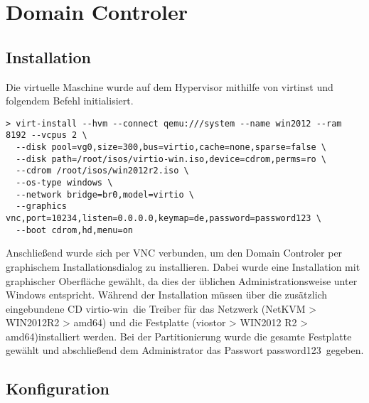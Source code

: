 \section{Domain Controler}

\subsection{Installation}

Die virtuelle Maschine wurde auf dem Hypervisor mithilfe von {\sc virtinst} und folgendem Befehl initialisiert.

\begin{lstlisting}[numbers=none]
> virt-install --hvm --connect qemu:///system --name win2012 --ram 8192 --vcpus 2 \
  --disk pool=vg0,size=300,bus=virtio,cache=none,sparse=false \
  --disk path=/root/isos/virtio-win.iso,device=cdrom,perms=ro \
  --cdrom /root/isos/win2012r2.iso \
  --os-type windows \
  --network bridge=br0,model=virtio \
  --graphics vnc,port=10234,listen=0.0.0.0,keymap=de,password=password123 \
  --boot cdrom,hd,menu=on
\end{lstlisting}

Anschließend wurde sich per VNC verbunden, um den Domain Controler per graphischem Installationsdialog zu installieren. Dabei wurde eine Installation mit graphischer Oberfläche gewählt, da dies der üblichen Administrationsweise unter Windows entspricht. Während der Installation müssen über die zusätzlich eingebundene CD \ql virtio-win\qr\ die Treiber für das Netzwerk ({\sc NetKVM > WIN2012R2 > amd64}) und die Festplatte ({\sc viostor > WIN2012	R2 > amd64})installiert werden. Bei der Partitionierung wurde die gesamte Festplatte gewählt und abschließend dem Administrator das Passwort \ql password123\qr\ gegeben.

\subsection{Konfiguration}